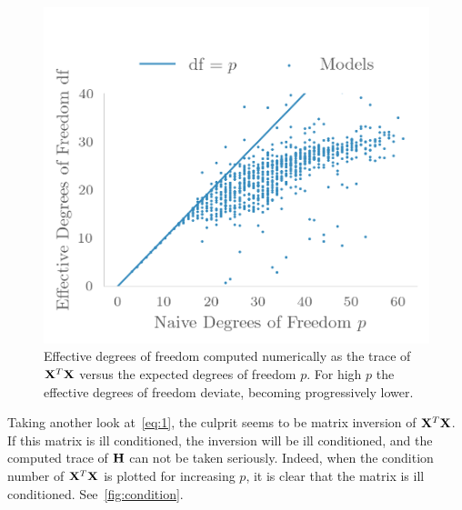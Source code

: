 \begin{figure}[]
  \centering
  \includegraphics[]{figures/effectivedf.png}
  \caption{\label{fig:effectivedf} Effective degrees of freedom computed
    numerically as the trace of \(\vb{X}^{T}\vb{X}\) versus the expected degrees
    of freedom \(p\). For high \(p\) the effective degrees of freedom deviate,
    becoming progressively lower.}
\end{figure}

Taking another look at~\cref{eq:1}, the culprit seems to be matrix inversion of
\(\vb{X}^{T}\vb{X}\). If this matrix is ill conditioned, the inversion will
be ill conditioned, and the computed trace of \(\vb{H}\) can not be taken
seriously. Indeed, when the condition number of \(\vb{X}^{T}\vb{X}\) is plotted
for increasing \(p\), it is clear that the matrix is ill conditioned.
See~\cref{fig:condition}.  

